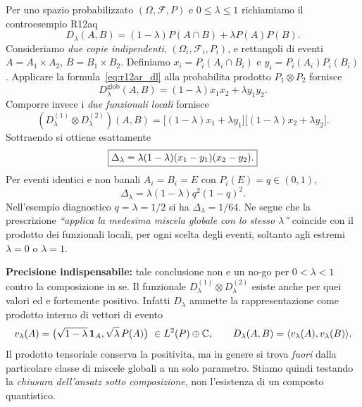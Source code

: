 \documentclass[11pt,a4paper]{article}
\begin{document}
Per uno spazio probabilizzato $(\Omega,\mathcal F,P)$ e $0\le\lambda\le1$
richiamiamo il controesempio R12aq
\begin{equation}\label{eq:r12ar_dl}
 D_\lambda(A,B)=(1-\lambda)P(A\cap B)+\lambda P(A)P(B).
\end{equation}
Consideriamo \emph{due copie indipendenti}, $(\Omega_i,\mathcal F_i,P_i)$,
e rettangoli di eventi $A=A_1\times A_2$, $B=B_1\times B_2$.
Definiamo $x_i=P_i(A_i\cap B_i)$ e $y_i=P_i(A_i)P_i(B_i)$.
Applicare la formula~\eqref{eq:r12ar_dl} alla probabilita prodotto
$P_1\otimes P_2$ fornisce
\begin{equation}
 D_\lambda^{\mathrm{glob}}(A,B)=(1-\lambda)x_1x_2+\lambda y_1y_2.
\end{equation}
Comporre invece i \emph{due funzionali locali} fornisce
\begin{equation}
 (D_\lambda^{(1)}\!\otimes D_\lambda^{(2)})(A,B)
 =\big[(1-\lambda)x_1+\lambda y_1\big]
  \big[(1-\lambda)x_2+\lambda y_2\big].
\end{equation}
Sottraendo si ottiene esattamente
\begin{equation}\boxed{\label{eq:r12ar_defect}
 \Delta_\lambda=\lambda(1-\lambda)(x_1-y_1)(x_2-y_2).}
\end{equation}
Per eventi identici e non banali $A_i=B_i=E$ con $P_i(E)=q\in(0,1)$,
\begin{equation}\label{eq:r12ar_simple}
 \Delta_\lambda=\lambda(1-\lambda)q^2(1-q)^2.
\end{equation}
Nell'esempio diagnostico $q=\lambda=1/2$ si ha
$\Delta_\lambda=1/64$. Ne segue che la prescrizione \emph{``applica la
medesima miscela globale con lo stesso $\lambda$''} coincide con il
prodotto dei funzionali locali, per ogni scelta degli eventi, soltanto
agli estremi $\lambda=0$ o $\lambda=1$.

\textbf{Precisione indispensabile:} tale conclusione non e un no-go per
$0<\lambda<1$ contro la composizione in se. Il funzionale
$D_\lambda^{(1)}\otimes D_\lambda^{(2)}$ esiste anche per quei valori ed
e fortemente positivo. Infatti $D_\lambda$ ammette la rappresentazione
come prodotto interno di vettori di evento
\begin{equation}
 v_\lambda(A)=\big(\sqrt{1-\lambda}\,{\bf1}_A,
                    \sqrt\lambda\,P(A)\big)
 \ \in L^2(P)\oplus\mathbb C,
 \qquad D_\lambda(A,B)=\langle v_\lambda(A),v_\lambda(B)\rangle.
\end{equation}
Il prodotto tensoriale conserva la positivita, ma in genere si trova
\emph{fuori} dalla particolare classe di miscele globali a un solo
parametro. Stiamo quindi testando la \emph{chiusura dell'ansatz sotto
composizione}, non l'esistenza di un composto quantistico.
\end{document}
